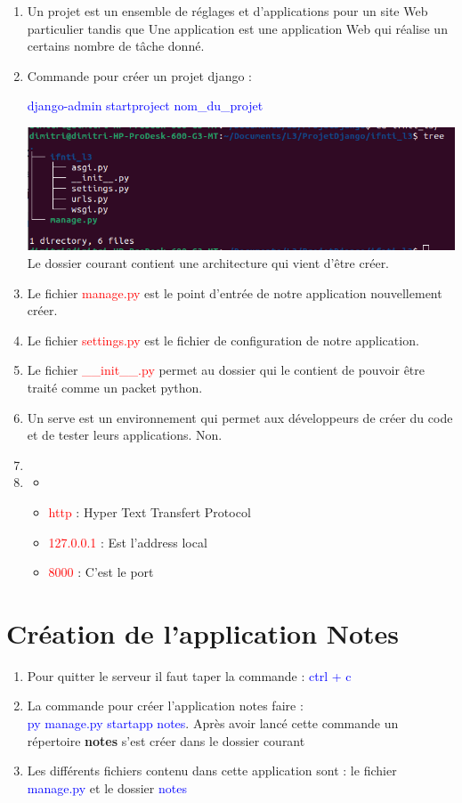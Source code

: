 \documentclass[10pt,a4paper]{article}
\begin{document}
\begin{enumerate}
\item Un projet est un ensemble de réglages et d’applications pour un site Web particulier tandis que Une application est une application Web qui réalise un certains nombre de tâche donné. 
\item Commande pour créer un projet django :\\ \begin{center}
\textcolor{blue}{django-admin startproject nom\_du\_projet}
\end{center}

\includegraphics[scale=0.4]{6.png}\\
Le dossier courant contient une architecture qui vient d'être créer.

\item Le fichier \textcolor{red}{manage.py} est le point d'entrée de notre application nouvellement créer.
\item Le fichier \textcolor{red}{settings.py} est le fichier de configuration de notre application.
\item Le fichier \textcolor{red}{\_\_init\_\_.py} permet au dossier qui le contient de pouvoir être traité comme un packet python.
\item Un serve est un environnement qui permet aux développeurs de créer du code et de tester leurs applications. Non.
\item 
\item 
\begin{itemize}
\item[]
\item \textcolor{red}{http} : Hyper Text Transfert Protocol
\item \textcolor{red}{127.0.0.1} : Est l'address local
\item \textcolor{red}{8000} : C'est le port
\end{itemize}
\end{enumerate}

\section{Création de l'application Notes}
\begin{enumerate}
\item Pour quitter le serveur il faut taper la commande : \textcolor{blue}{ctrl + c}
\item La commande pour créer l'application notes faire :\\ \textcolor{blue}{py manage.py startapp notes}. Après avoir lancé cette commande un répertoire \textbf{notes} s'est créer dans le dossier courant
\item Les différents fichiers contenu dans cette application sont : le fichier \textcolor{blue}{manage.py} et le dossier \textcolor{blue}{notes}
\end{enumerate}
\end{document}
